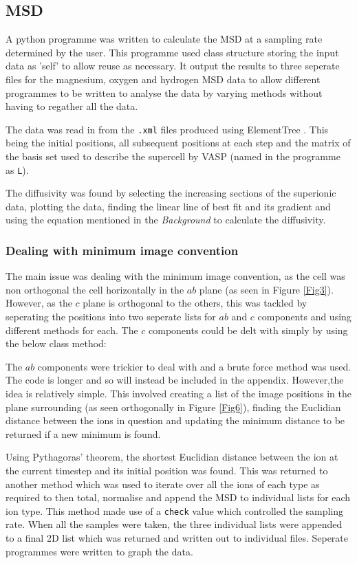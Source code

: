 \documentclass[a4paper,12pt]{article}
\begin{document}
\subsection{MSD}
A python programme was written to calculate the MSD at a sampling rate determined by the user. This programme used class structure storing the input data as 'self' to allow reuse as necessary. It output the results to three seperate files for the magnesium, oxygen and hydrogen MSD data to allow different programmes to be written to analyse the data  by varying methods without having to regather all the data.

The data was read in from the \texttt{.xml} files produced using ElementTree \cite{ETree}. This being the initial positions, all subsequent positions at each step and the matrix of the basis set used to describe the supercell by VASP (named in the programme as \texttt{L}).

The diffusivity was found by selecting the increasing sections of the superionic data, plotting the data, finding the linear line of best fit and its gradient and using the equation mentioned in the \textit{Background} to calculate the diffusivity.

\subsubsection{Dealing with minimum image convention}
The main issue was dealing with the minimum image convention, as the cell was non orthogonal the cell horizontally in the $ab$ plane (as seen in Figure \ref{Fig3}). However, as the $c$ plane is orthogonal to the others, this was tackled by seperating the positions into two seperate lists for $ab$ and $c$ components and using different methods for each. The $c$ components could be delt with simply by using the below class method:

\smallskip

\smallskip

The $ab$ components were trickier to deal with and a brute force method was used. The code is longer and so will instead be included in the appendix. However,the idea is relatively simple. This involved creating a list of the image positions in the plane surrounding (as seen orthogonally in Figure \ref{Fig6}), finding the Euclidian distance between the ions in question and updating the minimum distance to be returned if a new minimum is found.
\bigskip

\noindent Using Pythagoras' theorem, the shortest Euclidian distance between the ion at the current timestep and its initial position was found. This was returned to another method which was used to iterate over all the ions of each type as required to then total, normalise and append the MSD to individual lists for each ion type. This method made use of a \texttt{check} value which controlled the sampling rate. When all the samples were taken, the three individual lists were appended to a final 2D list which was returned and written out to individual files. Seperate programmes were written to graph the data.
\end{document}
